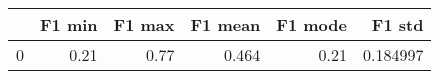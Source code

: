 \begin{tabular}{lrrrrr}
\toprule
{} &  F1 min &  F1 max &  F1 mean &  F1 mode &    F1 std \\
\midrule
0 &    0.21 &    0.77 &    0.464 &     0.21 &  0.184997 \\
\bottomrule
\end{tabular}
